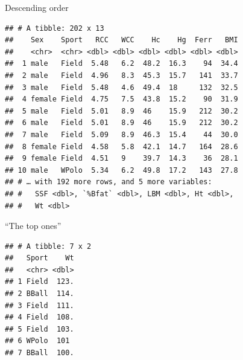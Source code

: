 \documentclass[ignorenonframetext,]{beamer}
\newenvironment{Shaded}{\begin{snugshade}}{\end{snugshade}}
\newcommand{\DecValTok}[1]{\textcolor[rgb]{0.00,0.00,0.81}{#1}}
\newcommand{\KeywordTok}[1]{\textcolor[rgb]{0.13,0.29,0.53}{\textbf{#1}}}
\newcommand{\NormalTok}[1]{#1}
\newcommand{\OperatorTok}[1]{\textcolor[rgb]{0.81,0.36,0.00}{\textbf{#1}}}
\newcommand{\StringTok}[1]{\textcolor[rgb]{0.31,0.60,0.02}{#1}}
\begin{document}
\begin{frame}[fragile]{Descending order}
\protect\hypertarget{descending-order}{}

\begin{Shaded}
\end{Shaded}

\begin{verbatim}
## # A tibble: 202 x 13
##    Sex    Sport   RCC   WCC    Hc    Hg  Ferr   BMI
##    <chr>  <chr> <dbl> <dbl> <dbl> <dbl> <dbl> <dbl>
##  1 male   Field  5.48   6.2  48.2  16.3    94  34.4
##  2 male   Field  4.96   8.3  45.3  15.7   141  33.7
##  3 male   Field  5.48   4.6  49.4  18     132  32.5
##  4 female Field  4.75   7.5  43.8  15.2    90  31.9
##  5 male   Field  5.01   8.9  46    15.9   212  30.2
##  6 male   Field  5.01   8.9  46    15.9   212  30.2
##  7 male   Field  5.09   8.9  46.3  15.4    44  30.0
##  8 female Field  4.58   5.8  42.1  14.7   164  28.6
##  9 female Field  4.51   9    39.7  14.3    36  28.1
## 10 male   WPolo  5.34   6.2  49.8  17.2   143  27.8
## # … with 192 more rows, and 5 more variables:
## #   SSF <dbl>, `%Bfat` <dbl>, LBM <dbl>, Ht <dbl>,
## #   Wt <dbl>
\end{verbatim}

\end{frame}

\begin{frame}[fragile]{``The top ones''}
\protect\hypertarget{the-top-ones}{}

\begin{Shaded}
\end{Shaded}

\begin{verbatim}
## # A tibble: 7 x 2
##   Sport    Wt
##   <chr> <dbl>
## 1 Field  123.
## 2 BBall  114.
## 3 Field  111.
## 4 Field  108.
## 5 Field  103.
## 6 WPolo  101 
## 7 BBall  100.
\end{verbatim}

\end{frame}
\end{document}
